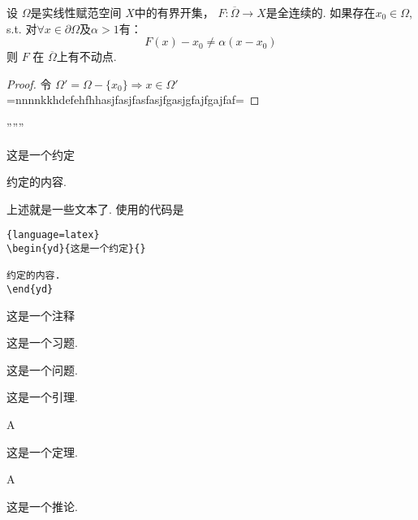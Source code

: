 \documentclass[a4,10pt]{ctexart}
\begin{document}
\begin{tl}{}
  设 $\Omega$是实线性赋范空间 $X$中的有界开集， $F:\overline{\Omega}\to{X}$是全连续的. 如果存在$x_0\in\Omega$, s.t. 对$\forall{x}\in \partial\Omega$及$\alpha>1$有：
  \[F(x)-x_0\neq\alpha(x-x_0)\]
  则 $F$ 在 $\overline{\Omega}$上有不动点.
\end{tl}
\begin{proof}
  令 $\Omega'=\Omega-\{x_0\}\Rightarrow{x}\in\Omega'$ =nnnnkkhdefehfhhasjfasjfasfasjfgasjgfajfgajfaf=
\end{proof}
''''''

\begin{yd}{这是一个约定}{}
              
约定的内容.
\end{yd}

上述就是一些文本了. 使用的代码是
\begin{lstlisting}{language=latex}
\begin{yd}{这是一个约定}{}
              
约定的内容.
\end{yd}
\end{lstlisting}

\begin{zs}
        
这是一个注释
    
\end{zs}
    
\begin{xt}
        
这是一个习题.
    
\end{xt}
    
\begin{lt}
        
这是一个问题.
    
\end{lt}

\begin{yl}
        
这是一个引理.
    
\end{yl}

\begin{dl}{A}{}
        
这是一个定理.
    
\end{dl}
    
\begin{tl}{A}{}
        
这是一个推论.
    
\end{tl}
\end{document}
